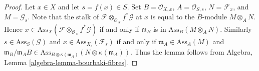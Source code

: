 \documentclass[10pt,a4paper]{amsart}
\theoremstyle{plain}
\theoremstyle{definition}
\theoremstyle{remark}
\numberwithin{equation}{subsection}
\begin{document}
\begin{proof}
Let $x \in X$ and let $s = f(x) \in S$.
Set $B = \mathcal{O}_{X, x}$, $A = \mathcal{O}_{S, s}$,
$N = \mathcal{F}_x$, and $M = \mathcal{G}_s$.
Note that the stalk of $\mathcal{F} \otimes_{\mathcal{O}_X} f^*\mathcal{G}$
at $x$ is equal to the $B$-module $M \otimes_A N$. Hence
$x \in \text{Ass}_X(\mathcal{F} \otimes_{\mathcal{O}_X} f^*\mathcal{G})$
if and only if $\mathfrak m_B$ is in $\text{Ass}_B(M \otimes_A N)$.
Similarly $s \in \text{Ass}_S(\mathcal{G})$ and
$x \in \text{Ass}_{X_s}(\mathcal{F}_s)$ if and only if
$\mathfrak m_A \in \text{Ass}_A(M)$ and
$\mathfrak m_B/\mathfrak m_A B \in
\text{Ass}_{B \otimes \kappa(\mathfrak m_A)}(N \otimes \kappa(\mathfrak m_A))$.
Thus the lemma follows from
Algebra, Lemma \ref{algebra-lemma-bourbaki-fibres}.
\end{proof}
\end{document}
